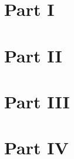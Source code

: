 \documentclass[handout]{beamer}
\begin{document}
	\part{Part I}
	\part{Part II}
	
	\part{Part III}
	
	\part{Part IV}
	
\end{document}
